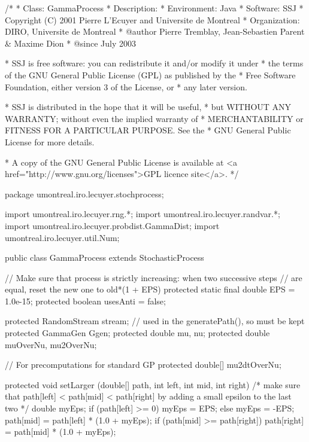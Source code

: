 \begin{code}
\begin{hide}
/*
 * Class:        GammaProcess
 * Description:
 * Environment:  Java
 * Software:     SSJ
 * Copyright (C) 2001  Pierre L'Ecuyer and Universite de Montreal
 * Organization: DIRO, Universite de Montreal
 * @author       Pierre Tremblay, Jean-Sebastien Parent & Maxime Dion
 * @since        July 2003

 * SSJ is free software: you can redistribute it and/or modify it under
 * the terms of the GNU General Public License (GPL) as published by the
 * Free Software Foundation, either version 3 of the License, or
 * any later version.

 * SSJ is distributed in the hope that it will be useful,
 * but WITHOUT ANY WARRANTY; without even the implied warranty of
 * MERCHANTABILITY or FITNESS FOR A PARTICULAR PURPOSE.  See the
 * GNU General Public License for more details.

 * A copy of the GNU General Public License is available at
   <a href="http://www.gnu.org/licenses">GPL licence site</a>.
 */
\end{hide}
package umontreal.iro.lecuyer.stochprocess;\begin{hide}
import umontreal.iro.lecuyer.rng.*;
import umontreal.iro.lecuyer.randvar.*;
import umontreal.iro.lecuyer.probdist.GammaDist;
import umontreal.iro.lecuyer.util.Num;
\end{hide}

public class GammaProcess extends StochasticProcess \begin{hide} {
   // Make sure that process is strictly increasing: when two successive steps
   // are equal, reset the new one to   old*(1 + EPS)
    protected static final double EPS = 1.0e-15;
    protected boolean      usesAnti = false;

    protected RandomStream stream; // used in the generatePath(), so must be kept
    protected GammaGen     Ggen;
    protected double       mu,
                           nu;
    protected double       muOverNu,
                           mu2OverNu;

    // For precomputations for standard GP
    protected double[]     mu2dtOverNu;

   protected void setLarger (double[] path, int left, int mid, int right) {
      /* make sure that path[left] < path[mid] < path[right] by adding a
         small epsilon to the last two */
      double myEps;
      if (path[left] >= 0)
         myEps = EPS;
      else
         myEps = -EPS;
      path[mid] = path[left] * (1.0 + myEps);
      if (path[mid] >= path[right])
         path[right] = path[mid] * (1.0 + myEps);
   }


}
\end{hide}
\end{code}
